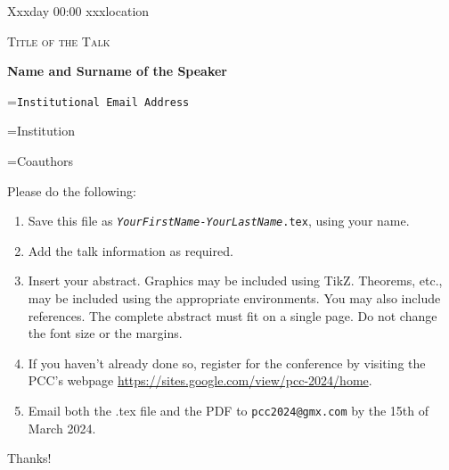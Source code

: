 \documentclass[12pt,a4paper]{article}
\newcommand{\TalkTimeLocation}{Xxxday 00:00 xxxlocation}
\newcommand{\ifEmpty}[3]{\setbox0=\hbox{#1\unskip}\ifdim\wd0=0pt{#2}\else{#3}\fi}
\newcommand{\nothingIfEmpty}[2]{\ifEmpty{#1}{}{#2}}
\newcommand{\showIfNotEmpty}[1]{\nothingIfEmpty{#1}{#1}}
\newcommand{\showTalkJointWork}[1]{\nothingIfEmpty{#1}{(This talk is based on joint work with (#1).)}}
\newcommand{\TalkTitle}{Title of the Talk}
\newcommand{\TalkPresenter}{Name and Surname of the Speaker}
\newcommand{\TalkEmail}{Institutional Email Address}
\newcommand{\TalkAffiliation}{Institution}
\newcommand{\TalkJointWork}{Coauthors}     %
\begin{document}
\hfill \textsf{\TalkTimeLocation}
\begin{center}
 {\Large\textsc{\TalkTitle}}

 \textbf{\TalkPresenter}

 \showIfNotEmpty{\texttt{\TalkEmail}}

 \showIfNotEmpty{\TalkAffiliation}

 \showTalkJointWork{\TalkJointWork}

 \bigskip\bigskip
\end{center}



Please do the following:
\begin{enumerate}
\item Save this file as \texttt{\emph{YourFirstName}-\emph{YourLastName}.tex}, using your name.
\item Add the talk information as required. 
\item Insert your abstract. Graphics may be included using TikZ. Theorems, etc., may be included using the appropriate environments. You may also include references. The complete abstract must fit on a single page. Do not change the font size or the margins.
\item If you haven't already done so, register for the conference by visiting the PCC's webpage \url{https://sites.google.com/view/pcc-2024/home}.
\item Email both the .tex file and the PDF to \texttt{pcc2024@gmx.com} by the 15th of March 2024.
\end{enumerate}
Thanks!









\end{document}
